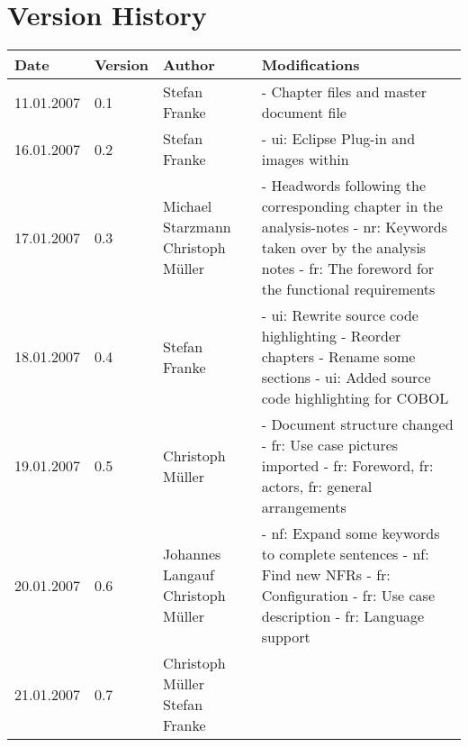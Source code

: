 
\section*{Version History}

{\small
\begin{longtable}{|l|l|p{35mm}|p{71mm}|} \hline
   {\normalsize \textbf{Date}} &
   {\normalsize \textbf{Version}} &
   {\normalsize \textbf{Author}} & 
   {\normalsize \textbf{Modifications}} \\\hline \hline \endhead
    11.01.2007 &  0.1 &  Stefan Franke & 
      - Chapter files and master document file \\\hline
    16.01.2007 &  0.2 &  Stefan Franke & 
      - ui: Eclipse Plug-in and images within \\\hline
    17.01.2007 &  0.3 & Michael Starzmann \newline Christoph Müller & 
      - Headwords following the corresponding chapter in the analysis-notes \newline
      - nr: Keywords taken over by the analysis notes \newline
      - fr: The foreword for the functional requirements \\\hline
    18.01.2007 &  0.4 &  Stefan Franke & 
      - ui: Rewrite source code highlighting \newline
      - Reorder chapters \newline
      - Rename some sections \newline
      - ui: Added source code highlighting for COBOL \\\hline
    19.01.2007 &  0.5 &  Christoph Müller & 
      - Document structure changed \newline
      - fr: Use case pictures imported \newline
      - fr: Foreword, fr: actors, fr: general arrangements \\\hline
    20.01.2007 & 0.6 & Johannes Langauf \newline Christoph Müller & 
      - nf: Expand some keywords to complete sentences \newline
      - nf: Find new NFRs \newline
      - fr: Configuration \newline
      - fr: Use case description \newline
      - fr: Language support \\\hline
    21.01.2007 & 0.7 & Christoph Müller \newline Stefan Franke & 

\end{longtable}}
